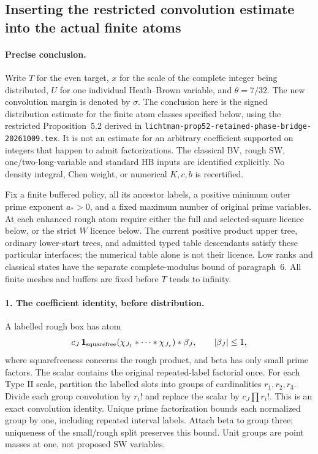 \subsection{Inserting the restricted convolution estimate into the actual finite atoms}
\label{sec:lichtman-hb-modulus-insertion-20261009}

\paragraph{Precise conclusion.}
Write $T$ for the even target, $x$ for the scale of the complete integer
being distributed, $U$ for one individual Heath--Brown variable, and
$\theta=7/32$. The new convolution margin is denoted by $\sigma$.
The conclusion here is the signed distribution estimate for the finite
atom classes specified below, using the restricted Proposition~5.2
derived in \texttt{lichtman-prop52-retained-phase-bridge-20261009.tex}.
It is not an estimate for an arbitrary coefficient supported on integers
that happen to admit factorizations. The classical BV, rough SW,
one/two-long-variable and standard HB inputs are identified explicitly.
No density integral, Chen weight, or numerical $K,c,b$ is recertified.

Fix a finite buffered policy, all its ancestor labels, a positive minimum
outer prime exponent $a_*>0$, and a fixed maximum number of original
prime variables. At each enhanced rough atom require either the full
and selected-square licence below, or the strict $W$ licence below.
The current positive product upper tree, ordinary lower-start trees,
and admitted typed table descendants satisfy these particular interfaces;
the numerical table alone is not their licence. Low ranks and classical
states have the separate complete-modulus bound of paragraph~6.
All finite meshes and buffers are fixed before $T$ tends to infinity.

\paragraph{1. The coefficient identity, before distribution.}
A labelled rough box has atom
\[
 c_J\,\mathbf1_{\rm squarefree}
  (\chi_{J_1}*\cdots*\chi_{J_r})*\beta_J,
 \qquad |\beta_J|\le1,
\]
where squarefreeness concerns the rough product, and beta has only small
prime factors. The scalar contains the original repeated-label factorial
once. For each Type II scale, partition the labelled slots into groups
of cardinalities $r_1,r_2,r_3$. Divide each group convolution by $r_i!$
and replace the scalar by $c_J\prod r_i!$. This is an exact convolution
identity. Unique prime factorization bounds each normalized group by one,
including repeated interval labels. Attach beta to group three; uniqueness
of the small/rough split preserves this bound. Unit groups are point
masses at one, not proposed SW variables.

